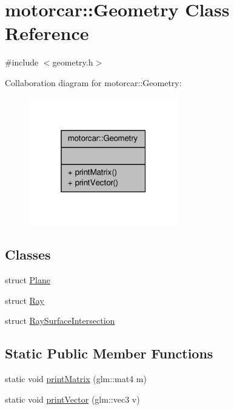 \hypertarget{classmotorcar_1_1Geometry}{\section{motorcar\-:\-:Geometry Class Reference}
\label{classmotorcar_1_1Geometry}
}


{\ttfamily \#include $<$geometry.\-h$>$}



Collaboration diagram for motorcar\-:\-:Geometry\-:
\nopagebreak
\begin{figure}[H]
\begin{center}
\leavevmode
\includegraphics[width=184pt]{classmotorcar_1_1Geometry__coll__graph}
\end{center}
\end{figure}
\subsection*{Classes}
\begin{DoxyCompactItemize}
\item 
struct \hyperlink{structmotorcar_1_1Geometry_1_1Plane}{Plane}
\item 
struct \hyperlink{structmotorcar_1_1Geometry_1_1Ray}{Ray}
\item 
struct \hyperlink{structmotorcar_1_1Geometry_1_1RaySurfaceIntersection}{Ray\-Surface\-Intersection}
\end{DoxyCompactItemize}
\subsection*{Static Public Member Functions}
\begin{DoxyCompactItemize}
\item 
static void \hyperlink{classmotorcar_1_1Geometry_a35ee70e5dab9981b9f1914eca9580b06}{print\-Matrix} (glm\-::mat4 m)
\item 
static void \hyperlink{classmotorcar_1_1Geometry_a97660333acd464a86c5ab7f5672fb3d2}{print\-Vector} (glm\-::vec3 v)
\end{DoxyCompactItemize}



